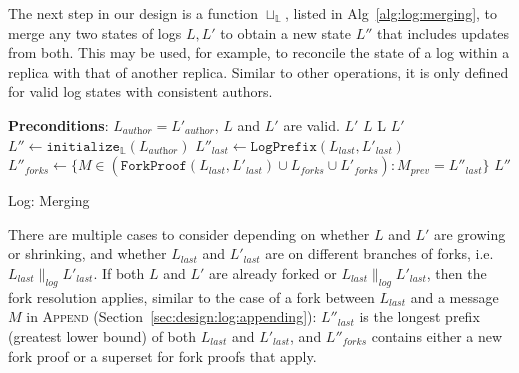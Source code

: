\documentclass[9pt, oneside]{article}   	%
\begin{document}
The next step in our design is a function $\sqcup_\mathds{L}$, listed in Alg~\ref{alg:log:merging}, to merge any two states of logs $L,L'$ to obtain a new state $L''$ that includes updates from both. This may be used, for example, to reconcile the state of a log within a replica with that of another replica.  Similar to other operations, it is only defined for valid log states with consistent authors. 

\begin{algorithm}[h]
\begin{algorithmic}[1]
	\State \textbf{Preconditions}:  $L_\textit{author} = L'_\textit{author}$, $L$ and $L'$ are valid.
	\State
		 
				 \State \Return $L'$
			\Else
				 \State \Return $L$
			\EndIf
			 \State \Return L 
			 \State \Return $L'$ 
		\EndIf
	\EndIf
	\State
	\State $L'' \leftarrow \texttt{initialize}_\mathds{L}(L_\textit{author})$
	\State $L''_\textit{last} \leftarrow \texttt{LogPrefix}(L_\textit{last},L'_\textit{last})$
	\State $L''_\textit{forks} \leftarrow \{ M \in (\texttt{ForkProof}(L_\textit{last},L'_\textit{last}) \cup L_\textit{forks} \cup L'_\textit{forks}) : M_\textit{prev} = L''_\textit{last} \}$
	\State \Return $L''$	
\EndFunction
\end{algorithmic}
\caption{\label{alg:log:merging} Log: Merging}
\end{algorithm}

There are multiple cases to consider depending on whether $L$ and $L'$ are growing or shrinking, and whether $L_\textit{last}$ and $L'_\textit{last}$ are on different branches of forks, i.e. $L_\textit{last} \parallel_\textit{log} L'_\textit{last}$.  If both $L$ and $L'$ are already forked or  $L_\textit{last} \parallel_\textit{log} L'_\textit{last}$, then the fork resolution applies, similar to the case of a fork between $L_\textit{last}$ and a message $M$ in \textsc{Append} (Section~\ref{sec:design:log:appending}): $L''_\textit{last}$ is the longest prefix (greatest lower bound) of both $L_\textit{last}$ and $L'_\textit{last}$, and $L''_\textit{forks}$ contains either a new fork proof or a superset for fork proofs that apply. 
\end{document}
